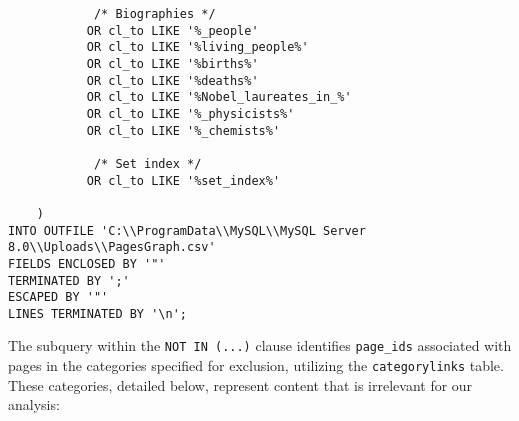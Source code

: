 \begin{sourcecode}
{\begin{verbatim}
            /* Biographies */
           OR cl_to LIKE '%_people'
           OR cl_to LIKE '%living_people%'
           OR cl_to LIKE '%births%'
           OR cl_to LIKE '%deaths%'
           OR cl_to LIKE '%Nobel_laureates_in_%'
           OR cl_to LIKE '%_physicists%'
           OR cl_to LIKE '%_chemists%'
           
            /* Set index */
           OR cl_to LIKE '%set_index%'

    )
INTO OUTFILE 'C:\\ProgramData\\MySQL\\MySQL Server 8.0\\Uploads\\PagesGraph.csv'
FIELDS ENCLOSED BY '"'
TERMINATED BY ';'
ESCAPED BY '"'
LINES TERMINATED BY '\n';
\end{verbatim}}
\end{sourcecode}

The subquery within the \texttt{NOT IN (...)} clause identifies \texttt{page\_ids} associated with pages in the categories specified for exclusion, utilizing the \texttt{categorylinks} table. These categories, detailed below, represent content that is irrelevant for our analysis:

